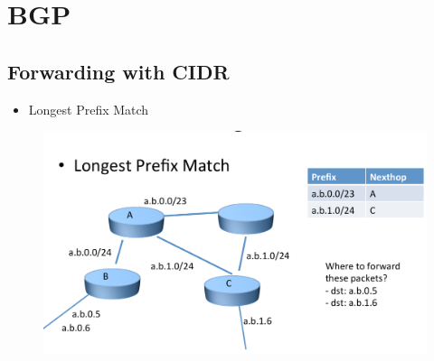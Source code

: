\section{BGP}
\subsection{Forwarding with CIDR}
\begin{itemize}
    \item Longest Prefix Match
\end{itemize}
\begin{figure}
    \includegraphics[width=\textwidth]{lazy/longestprefix.png}
\end{figure}